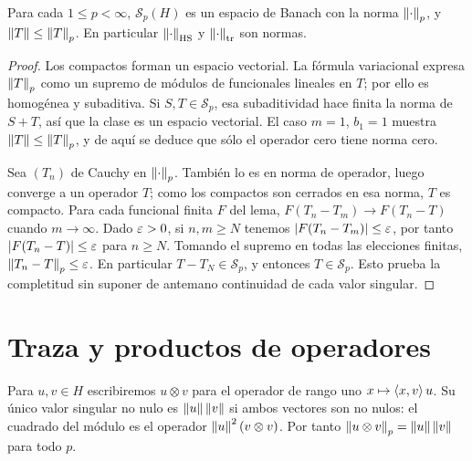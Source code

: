 \begin{teorema}\label{v3:schatten-banach}
Para cada $1\le p<\infty$, $\mathcal S_p(H)$ es un espacio de Banach con la norma $\left\lVert\cdot\right\rVert_p$, y $\left\lVert T\right\rVert\le\left\lVert T\right\rVert_p$. En particular $\left\lVert\cdot\right\rVert_{\mathrm{HS}}$ y $\left\lVert\cdot\right\rVert_{\mathrm{tr}}$ son normas.
\end{teorema}
\begin{proof}
Los compactos forman un espacio vectorial. La fórmula variacional expresa $\left\lVert T\right\rVert_p$ como un supremo de módulos de funcionales lineales en $T$; por ello es homogénea y subaditiva. Si $S,T\in\mathcal S_p$, esa subaditividad hace finita la norma de $S+T$, así que la clase es un espacio vectorial. El caso $m=1$, $b_1=1$ muestra $\left\lVert T\right\rVert\le\left\lVert T\right\rVert_p$, y de aquí se deduce que sólo el operador cero tiene norma cero.

Sea $(T_n)$ de Cauchy en $\left\lVert\cdot\right\rVert_p$. También lo es en norma de operador, luego converge a un operador $T$; como los compactos son cerrados en esa norma, $T$ es compacto. Para cada funcional finita $F$ del lema, $F(T_n-T_m)\to F(T_n-T)$ cuando $m\to\infty$. Dado $\varepsilon>0$, si $n,m\ge N$ tenemos $|F(T_n-T_m)|\le\varepsilon$, por tanto $|F(T_n-T)|\le\varepsilon$ para $n\ge N$. Tomando el supremo en todas las elecciones finitas, $\left\lVert T_n-T\right\rVert_p\le\varepsilon$. En particular $T-T_N\in\mathcal S_p$, y entonces $T\in\mathcal S_p$. Esto prueba la completitud sin suponer de antemano continuidad de cada valor singular.
\end{proof}

\section{Traza y productos de operadores}
Para $u,v\in H$ escribiremos $u\otimes v$ para el operador de rango uno $x\mapsto\left\langle x,v\right\rangle u$. Su único valor singular no nulo es $\left\lVert u\right\rVert\left\lVert v\right\rVert$ si ambos vectores son no nulos: el cuadrado del módulo es el operador $\left\lVert u\right\rVert^2(v\otimes v)$. Por tanto $\left\lVert u\otimes v\right\rVert_p=\left\lVert u\right\rVert\left\lVert v\right\rVert$ para todo $p$.


